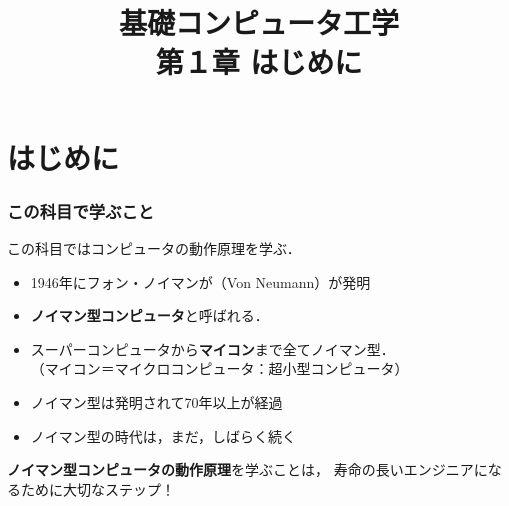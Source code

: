 \documentclass{beamer}                 %
\begin{document}
\title{基礎コンピュータ工学\\第１章 はじめに}
\date{}

\begin{frame}
  \titlepage
\end{frame}


\section{はじめに}
\begin{frame}
  \frametitle{この科目で学ぶこと}
  この科目ではコンピュータの動作原理を学ぶ．
  \vfill
  \begin{itemize}
  \item 1946年にフォン・ノイマンが（Von Neumann）が発明
  \item {\bf ノイマン型コンピュータ}と呼ばれる．
  \item スーパーコンピュータから{\bf マイコン}まで全てノイマン型．\\
    （マイコン＝マイクロコンピュータ：超小型コンピュータ）
  \item ノイマン型は発明されて70年以上が経過
  \item ノイマン型の時代は，まだ，しばらく続く
  \end{itemize}
  \vfill
  {\bf ノイマン型コンピュータの動作原理}を学ぶことは，
  寿命の長いエンジニアになるために大切なステップ！
\end{frame}
\end{document}
